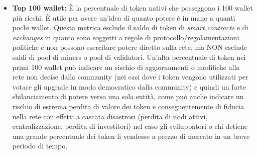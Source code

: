 \documentclass[a4paper, 12pt]{article}
\begin{document}
\begin{itemize}
\item \textbf{Top 100 wallet: }
È la percentuale di token nativi che posseggono i 100 wallet più ricchi.
È utile per avere un'idea di quanto potere è in mano a quanti pochi wallet.
Questa metrica esclude il saldo di token di \textit{smart contracts} e di \textit{exchanges} in quanto sono soggetti a regole di protocollo/regolamentazioni politiche e
non possono esercitare potere diretto sulla rete, ma NON esclude saldi di pool di miners o pool di validatori.
Un'alta percentuale di token nei primi 100 wallet può indicare un rischio di aggiornamenti o modifiche alla rete non decise dalla community (nei casi dove i token
vengono utilizzati per votare gli upgrade in modo democratico dalla community) e quindi un forte sbilanciamento di potere verso una sola entità, come può anche indicare un rischio
di estrema perdita di valore dei token e conseguentemente di fiducia nella rete con effetti a cascata disastrosi (perdita di nodi attivi, centralizzazione, perdita di investitori) nel caso gli sviluppatori o chi detiene una grande percentuale dei token li vendesse a prezzo di mercato in un breve periodo di tempo.

\end{itemize}

\renewcommand\arraystretch{1.6}
\end{document}

